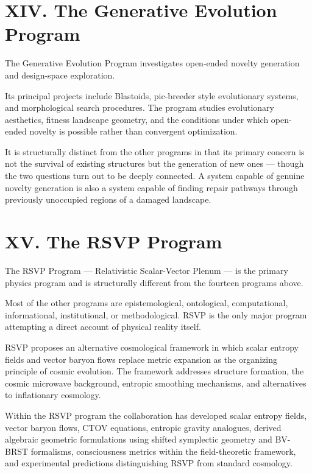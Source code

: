 \documentclass[12pt, openany]{book}
\begin{document}
\section{XIV. The Generative Evolution Program}

The Generative Evolution Program investigates open-ended novelty generation
and design-space exploration.

Its principal projects include Blastoids, pic-breeder style evolutionary
systems, and morphological search procedures. The program studies
evolutionary aesthetics, fitness landscape geometry, and the conditions
under which open-ended novelty is possible rather than convergent
optimization.

It is structurally distinct from the other programs in that its primary
concern is not the survival of existing structures but the generation of
new ones — though the two questions turn out to be deeply connected. A
system capable of genuine novelty generation is also a system capable of
finding repair pathways through previously unoccupied regions of a damaged
landscape.

\section{XV. The RSVP Program}

The RSVP Program — Relativistic Scalar-Vector Plenum — is the primary
physics program and is structurally different from the fourteen programs
above.

Most of the other programs are epistemological, ontological, computational,
informational, institutional, or methodological. RSVP is the only major
program attempting a direct account of physical reality itself.

RSVP proposes an alternative cosmological framework in which scalar entropy
fields and vector baryon flows replace metric expansion as the organizing
principle of cosmic evolution. The framework addresses structure formation,
the cosmic microwave background, entropic smoothing mechanisms, and
alternatives to inflationary cosmology.

Within the RSVP program the collaboration has developed scalar entropy
fields, vector baryon flows, CTOV equations, entropic gravity analogues,
derived algebraic geometric formulations using shifted symplectic geometry
and BV-BRST formalisms, consciousness metrics within the field-theoretic
framework, and experimental predictions distinguishing RSVP from standard
cosmology.
\end{document}
